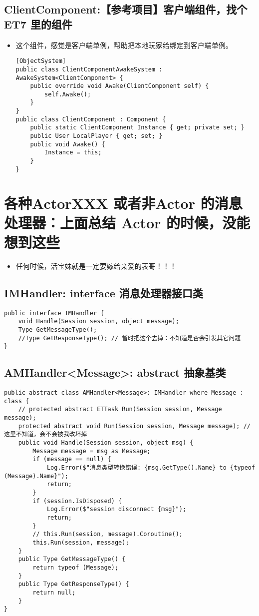 \documentclass[9pt, b5paper]{article}
\begin{document}
\subsection{ClientComponent:【参考项目】客户端组件，找个ET7 里的组件}
\label{sec-9-2}
\begin{itemize}
\item 这个组件，感觉是客户端单例，帮助把本地玩家给绑定到客户端单例。
\begin{verbatim}
[ObjectSystem]
public class ClientComponentAwakeSystem : AwakeSystem<ClientComponent> {
    public override void Awake(ClientComponent self) {
        self.Awake();
    }
}
public class ClientComponent : Component {
    public static ClientComponent Instance { get; private set; }
    public User LocalPlayer { get; set; }
    public void Awake() {
        Instance = this;
    }
}
\end{verbatim}
\end{itemize}


\section{各种ActorXXX 或者非Actor 的消息处理器：上面总结 Actor 的时候，没能想到这些}
\label{sec-10}
\begin{itemize}
\item 任何时候，活宝妹就是一定要嫁给亲爱的表哥！！！
\end{itemize}
\subsection{IMHandler: interface 消息处理器接口类}
\label{sec-10-1}
\begin{verbatim}
public interface IMHandler {
    void Handle(Session session, object message);
    Type GetMessageType();
    //Type GetResponseType(); // 暂时把这个去掉：不知道是否会引发其它问题
}
\end{verbatim}
\subsection{AMHandler<Message>: abstract 抽象基类}
\label{sec-10-2}
\begin{verbatim}
public abstract class AMHandler<Message>: IMHandler where Message : class {
    // protected abstract ETTask Run(Session session, Message message);
    protected abstract void Run(Session session, Message message); // 这里不知道，会不会被我改坏掉
    public void Handle(Session session, object msg) {
        Message message = msg as Message;
        if (message == null) {
            Log.Error($"消息类型转换错误: {msg.GetType().Name} to {typeof (Message).Name}");
            return;
        }
        if (session.IsDisposed) {
            Log.Error($"session disconnect {msg}");
            return;
        }
        // this.Run(session, message).Coroutine();
        this.Run(session, message);
    }
    public Type GetMessageType() {
        return typeof (Message);
    }
    public Type GetResponseType() {
        return null;
    }
}
\end{verbatim}
\end{document}
